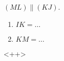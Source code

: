 

\begin{mental}

\( (ML)\parallel (KJ)\).


\begin{center}
   
\end{center}

\begin{enumerate}
    \item
        \( IK=\ldots\)
    \item
        \( KM=\ldots\)
\end{enumerate}

\end{mental}
<++>
